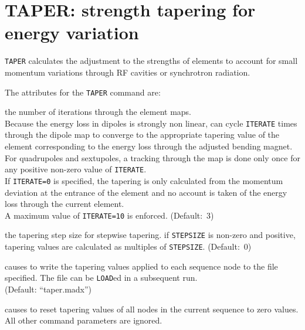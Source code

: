 
\chapter{TAPER: strength tapering for energy variation}
\label{chap:taper}

\texttt{TAPER} calculates the adjustment to the strengths of elements to
account for small momentum variations through RF cavities or synchrotron
radiation. 


The attributes for the \texttt{TAPER} command are: 
\begin{madlist}
   the number of iterations through the element maps. \\
  Because the energy loss in dipoles is strongly non linear, \madx
  can cycle \texttt{ITERATE} times through the dipole map to converge to the 
  appropriate tapering value of the element corresponding to the energy
  loss through the adjusted bending magnet.  \\
  For quadrupoles and sextupoles, a tracking through the map is
  done only once for any positive non-zero value of
  \texttt{ITERATE}. \\  
  If \texttt{ITERATE=0} is specified, the tapering is only calculated
  from the momentum deviation at the entrance of the element and no
  account is taken of the energy loss through the current element. \\
  A maximum value of \texttt{ITERATE=10} is enforced. (Default:~3)
  
   the tapering step size for stepwise tapering. if
  \texttt{STEPSIZE} is non-zero and positive, tapering values are
  calculated as multiples of \texttt{STEPSIZE}. (Default:~0)  
  
   causes \madx to write the tapering values applied to
  each sequence node to the file specified. The file can be
  \texttt{LOAD}ed in a subsequent \madx run. \\
  (Default: ``taper.madx'') 

   causes \madx to reset tapering values of all nodes
  in the current sequence to zero values. All other command parameters
  are ignored. 
  
\end{madlist}

